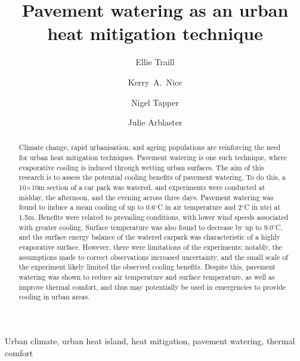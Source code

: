 \documentclass[final,3p,times,authoryear]{elsarticle}
\begin{document}
\title{Pavement watering as an urban heat mitigation technique}

\author[monash]{Ellie Traill}
\author[melb]{Kerry~A.~Nice}

\author[monash]{Nigel Tapper}
\author[monash]{Julie Arblaster}

\address[melb]{Transport, Health, and Urban Systems Research Lab, Faculty of Architecture, Building, and Planning, University of Melbourne, VIC, Australia.}
\address[monash]{School of Earth, Atmosphere and Environment, Monash University, Clayton, VIC 3800, Australia.}




\begin{abstract}

Climate change, rapid urbanisation, and ageing populations are reinforcing the need for urban heat mitigation techniques. Pavement watering is one such technique, where evaporative cooling is induced through wetting urban surfaces. The aim of this research is to assess the potential cooling benefits of pavement watering. To do this, a 10$\times$10m section of a car park was watered, and experiments were conducted at midday, the afternoon, and the evening across three days. Pavement watering was found to induce a mean cooling of up to 0.6$^{\circ}$C in air temperature and 2$^{\circ}$C in \gls{utci} at 1.5m. Benefits were related to prevailing conditions, with lower wind speeds associated with greater cooling. Surface temperature was also found to decrease by up to 9.0$^{\circ}$C, and the surface energy balance of the watered carpark was characteristic of a highly evaporative surface. However, there were limitations of the experiments; notably, the assumptions made to correct observations increased uncertainty, and the small scale of the experiment likely limited the observed cooling benefits. Despite this, pavement watering was shown to reduce air temperature and surface temperature, as well as improve thermal comfort, and thus may potentially be used in emergencies to provide cooling in urban areas.

\end{abstract}

\begin{keyword}
Urban climate\sep
urban heat island\sep 
heat mitigation\sep 
pavement watering\sep 
thermal comfort
\end{keyword}
\end{document}
